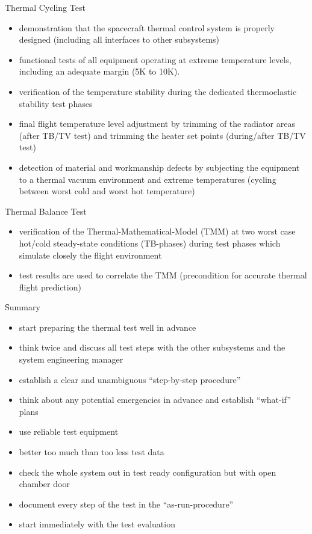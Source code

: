 \f{Thermal Cycling Test}
\begin{itemize}
 \item demonstration that the spacecraft thermal control system is properly designed (including all interfaces to other subsystems)
 \item functional tests of all equipment operating at extreme temperature levels, including an adequate margin (5K to 10K).
 \item verification of the temperature stability during the dedicated thermoelastic stability test phases
 \item final flight temperature level adjustment by trimming of the radiator areas (after TB/TV test) and trimming the heater set points (during/after TB/TV test)
 \item detection of material and workmanship defects by subjecting the equipment to a thermal vacuum environment and extreme temperatures (cycling between worst cold and worst hot 
 temperature)
\end{itemize}

\f{Thermal Balance Test}
\begin{itemize}
 \item verification of the Thermal-Mathematical-Model (TMM) at two worst case hot/cold steady-state conditions (TB-phases) during test phases which simulate closely the flight environment
 \item test results are used to correlate the TMM (precondition for accurate thermal flight prediction)
\end{itemize}

\f{Summary}
\begin{itemize}
 \item start preparing the thermal test well in advance
 \item think twice and discuss all test steps with the other subsystems and the system engineering manager
 \item establish a clear and unambiguous “step-by-step procedure”
 \item think about any potential emergencies in advance and establish “what-if” plans
 \item use reliable test equipment
 \item better too much than too less test data
 \item check the whole system out in test ready configuration but with open chamber door
 \item document every step of the test in the “as-run-procedure”
 \item start immediately with the test evaluation
\end{itemize}